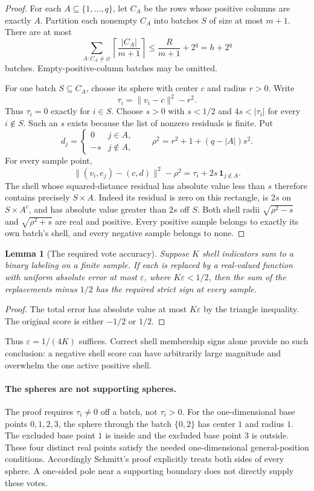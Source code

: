 \documentclass[11pt]{article}
\newtheorem{lemma}{Lemma}
\begin{document}
\begin{proof}
For each $A\subseteq\{1,\ldots,q\}$, let $C_A$ be the rows whose
positive columns are exactly $A$. Partition each nonempty $C_A$ into
batches $S$ of size at most $m+1$. There are at most
\[
 \sum_{A:C_A\ne\varnothing}
       \left\lceil\frac{|C_A|}{m+1}\right\rceil
 \le \frac{R}{m+1}+2^q=h+2^q
\]
batches. Empty-positive-column batches may be omitted.

For one batch $S\subseteq C_A$, choose its sphere with center $c$ and
radius $r>0$. Write
\[
 \tau_i=\|v_i-c\|^2-r^2.
\]
Thus $\tau_i=0$ exactly for $i\in S$. Choose $s>0$ with $s<1/2$
and $4s<|\tau_i|$ for every $i\notin S$. Such an $s$ exists because
the list of nonzero residuals is finite. Put
\[
 d_j=\begin{cases}0&j\in A,\\-s&j\notin A,\end{cases}
 \qquad
 \rho^2=r^2+1+(q-|A|)s^2.
\]
For every sample point,
\[
 \|(v_i,e_j)-(c,d)\|^2-\rho^2
   =\tau_i+2s\,\boldsymbol1_{j\notin A}.
\]
The shell whose squared-distance residual has absolute value less
than $s$ therefore contains precisely $S\times A$. Indeed its
residual is zero on this rectangle, is $2s$ on
$S\times A^c$, and has absolute value greater than $2s$ off $S$.
Both shell radii $\sqrt{\rho^2-s}$ and $\sqrt{\rho^2+s}$ are real
and positive. Every positive sample belongs to exactly its own
batch's shell, and every negative sample belongs to none.
\end{proof}

\begin{lemma}[The required vote accuracy]
Suppose $K$ shell indicators sum to a binary labeling on a finite
sample. If each is replaced by a real-valued function with uniform
absolute error at most $\varepsilon$, where $K\varepsilon<1/2$,
then the sum of the replacements minus $1/2$ has the required strict
sign at every sample.
\end{lemma}

\begin{proof}
The total error has absolute value at most $K\varepsilon$ by the
triangle inequality. The original score is either $-1/2$ or $1/2$.
\end{proof}

Thus $\varepsilon=1/(4K)$ suffices. Correct shell membership signs
alone provide no such conclusion: a negative shell score can have
arbitrarily large magnitude and overwhelm the one active positive
shell.

\paragraph{The spheres are not supporting spheres.}
The proof requires $\tau_i\ne0$ off a batch, not $\tau_i>0$.
For the one-dimensional base points $0,1,2,3$, the sphere through
the batch $\{0,2\}$ has center $1$ and radius $1$. The excluded
base point $1$ is inside and the excluded base point $3$ is outside.
These four distinct real points satisfy the needed one-dimensional
general-position conditions. Accordingly Schmitt's proof explicitly
treats both sides of every sphere. A one-sided pole near a supporting
boundary does not directly supply these votes.
\end{document}

